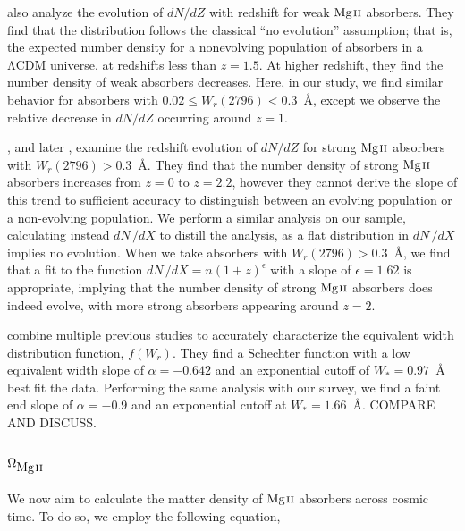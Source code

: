 \documentclass[iop,apj,numberedappendix,appendixfloats,twocolappendix]{emulateapj}
\begin{document}
\cite{Narayanan2007} also analyze the evolution of $dN\!/dZ$ with redshift for weak ${\hbox{{\rm Mg}\kern 0.1em{\sc ii}}}$ absorbers. They find that the distribution follows the classical ``no evolution'' assumption; that is, the expected number density for a nonevolving population of absorbers in a $\mathrm{\Lambda CDM}$ universe, at redshifts less than $z = 1.5$. At higher redshift, they find the number density of weak absorbers decreases. Here, in our study, we find similar behavior for absorbers with $0.02 \le W_r(2796) < 0.3$~{\AA}, except we observe the relative decrease in $dN\!/dZ$ occurring around $z = 1$.

\cite{Steidel1992}, and later \cite{Churchill2001}, examine the redshift evolution of $dN\!/dZ$ for strong ${\hbox{{\rm Mg}\kern 0.1em{\sc ii}}}$ absorbers with $W_r(2796) > 0.3$~{\AA}. They find that the number density of strong ${\hbox{{\rm Mg}\kern 0.1em{\sc ii}}}$ absorbers increases from $z = 0$ to $z = 2.2$, however they cannot derive the slope of this trend to sufficient accuracy to distinguish between an evolving population or a non-evolving population. We perform a similar analysis on our sample, calculating instead $dN\,/dX$ to distill the analysis, as a flat distribution in $dN\,/dX$ implies no evolution. When we take absorbers with $W_r(2796) > 0.3$~{\AA}, we find that a fit to the function $dN\,/dX = n(1+z)^{\epsilon}$ with a slope of $\epsilon = 1.62$ is appropriate, implying that the number density of strong ${\hbox{{\rm Mg}\kern 0.1em{\sc ii}}}$ absorbers does indeed evolve, with more strong absorbers appearing around $z = 2$.

\cite{Kacprzak2011MgII} combine multiple previous studies to accurately characterize the equivalent width distribution function, $f(W_r)$. They find a Schechter function with a low equivalent width slope of $\alpha = -0.642$ and an exponential cutoff of $W_* = 0.97$~{\AA} best fit the data. Performing the same analysis with our survey, we find a faint end slope of $\alpha = -0.9$ and an exponential cutoff at $W_* = 1.66$~{\AA}. COMPARE AND DISCUSS.


\subsection{$\Omega_{\hbox{{\rm Mg}\kern 0.1em{\sc ii}}}$}
\label{omegamgii}

We now aim to calculate the matter density of ${\hbox{{\rm Mg}\kern 0.1em{\sc ii}}}$ absorbers across cosmic time. To do so, we employ the following equation,
\end{document}
